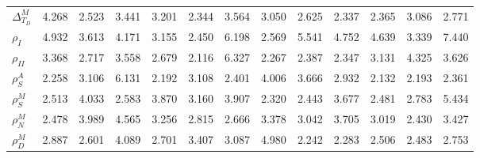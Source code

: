 \begin{center}
\begin{longtable}{lcccccccccccc}
$ {\Delta^{M}_{T_D}}   $	 & 	       4.268	 & 	       2.523	 & 	       3.441	 & 	       3.201	 & 	       2.344	 & 	       3.564	 & 	       3.050	 & 	       2.625	 & 	       2.337	 & 	       2.365	 & 	       3.086	 & 	       2.771 \\ 
$ {\rho_{I}}           $	 & 	       4.932	 & 	       3.613	 & 	       4.171	 & 	       3.155	 & 	       2.450	 & 	       6.198	 & 	       2.569	 & 	       5.541	 & 	       4.752	 & 	       4.639	 & 	       3.339	 & 	       7.440 \\ 
$ {\rho_{II}}          $	 & 	       3.368	 & 	       2.717	 & 	       3.558	 & 	       2.679	 & 	       2.116	 & 	       6.327	 & 	       2.267	 & 	       2.387	 & 	       2.347	 & 	       3.131	 & 	       4.325	 & 	       3.626 \\ 
$ {\rho^{A}_{S}}       $	 & 	       2.258	 & 	       3.106	 & 	       6.131	 & 	       2.192	 & 	       3.108	 & 	       2.401	 & 	       4.006	 & 	       3.666	 & 	       2.932	 & 	       2.132	 & 	       2.193	 & 	       2.361 \\ 
$ {\rho^{M}_{S}}       $	 & 	       2.513	 & 	       4.033	 & 	       2.583	 & 	       3.870	 & 	       3.160	 & 	       3.907	 & 	       2.320	 & 	       2.443	 & 	       3.677	 & 	       2.481	 & 	       2.783	 & 	       5.434 \\ 
$ {\rho^{M}_{N}}       $	 & 	       2.478	 & 	       3.989	 & 	       4.565	 & 	       3.256	 & 	       2.815	 & 	       2.666	 & 	       3.378	 & 	       3.042	 & 	       3.705	 & 	       3.019	 & 	       2.430	 & 	       3.427 \\ 
$ {\rho^{M}_{D}}       $	 & 	       2.887	 & 	       2.601	 & 	       4.089	 & 	       2.701	 & 	       3.407	 & 	       3.087	 & 	       4.980	 & 	       2.242	 & 	       2.283	 & 	       2.506	 & 	       2.483	 & 	       2.753 \\ 
\end{longtable}
 \end{center}
